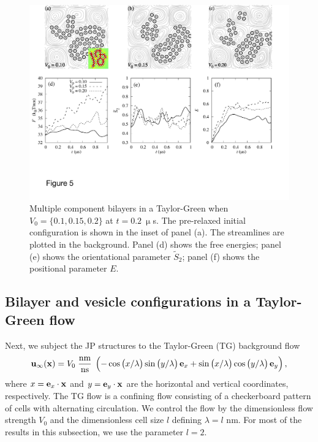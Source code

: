 \documentclass[prb,preprint,showpacs,preprintnumbers,amsmath,amssymb,longbibliography]{revtex4-1}
\newcommand{\xx}{\mathbf{x}}
\newcommand{\uu}{\mathbf{u}}
\begin{document}
%
\begin{figure}
  \begin{center}
    \includegraphics[width=1.0\textwidth]{Figures/Figure5.pdf}    
  \end{center}
  \vspace{-20pt}  
  \caption{\label{fig:BC1_TG} Multiple component bilayers in a
  Taylor-Green when $V_0 = \{0.1, 0.15, 0.2\}$ at $t=0.2\ \upmu$s. The
  pre-relaxed initial configuration is shown in the inset of panel (a).
  The streamlines are plotted in the background. Panel (d) shows the
  free energies; panel (e) shows the orientational parameter
  $\tilde{S}_2$; panel (f) shows the positional parameter $E$.}
\end{figure}
%
\subsection{Bilayer and vesicle configurations in a Taylor-Green flow}
Next, we subject the JP structures to the Taylor-Green (TG) background
flow
\begin{equation}
\label{eq:tg_flow}
\uu_\infty(\xx) = V_0\; \frac{\text{nm}}{\text{ns}}\;
\left(
-\cos\left(x/\lambda\right)
 \sin\left(y/\lambda\right)
         {\bf e}_x
         +\sin\left(x/\lambda\right)
         \cos\left(y/\lambda\right)
             {\bf e}_y\right),
\end{equation}
where $x = {\bf e}_x \cdot \xx$ and $y = {\bf e}_y \cdot \xx$
are the horizontal and vertical coordinates, respectively. 
The TG flow is a confining flow consisting of a checkerboard pattern
of cells with alternating circulation. We control the flow by the
dimensionless flow strength $V_0$ and the dimensionless cell size $l$
defining $\lambda = l$ nm. For most of the results in this subsection,
we use the parameter $l=2$.
%
\end{document}
